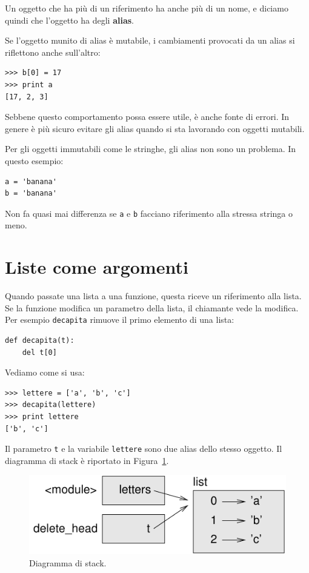 \documentclass[10pt]{book}
\begin{document}
Un oggetto che ha più di un riferimento ha anche più di un nome, e diciamo quindi che l'oggetto ha degli {\bf alias}.

Se l'oggetto munito di alias è mutabile, i cambiamenti provocati da un alias si riflettono anche sull'altro:

\begin{verbatim}
>>> b[0] = 17
>>> print a
[17, 2, 3]
\end{verbatim}
%
Sebbene questo comportamento possa essere utile, è anche fonte di errori. In genere è più sicuro evitare gli alias quando si sta lavorando con oggetti mutabili.

Per gli oggetti immutabili come le stringhe, gli alias non sono un problema. In questo esempio:

\begin{verbatim}
a = 'banana'
b = 'banana'
\end{verbatim}
%
Non fa quasi mai differenza se {\tt a} e {\tt b} facciano riferimento alla stressa stringa o meno.


\section{Liste come argomenti}
\label{list.arguments}

Quando passate una lista a una funzione, questa riceve un riferimento alla lista. Se la funzione modifica un parametro della lista, il chiamante vede la modifica. Per esempio \verb"decapita" rimuove il primo elemento di una lista:

\begin{verbatim}
def decapita(t):
    del t[0]
\end{verbatim}
%
Vediamo come si usa:

\begin{verbatim}
>>> lettere = ['a', 'b', 'c']
>>> decapita(lettere)
>>> print lettere
['b', 'c']
\end{verbatim}
%
Il parametro {\tt t} e la variabile {\tt lettere} sono due alias dello stesso oggetto. Il diagramma di stack è riportato in Figura~\ref{fig.stack5}.

\begin{figure}
\centerline
{\includegraphics[scale=0.8]{figs/stack5.pdf}}
\caption{Diagramma di stack.}
\label{fig.stack5}
\end{figure}
\end{document}
